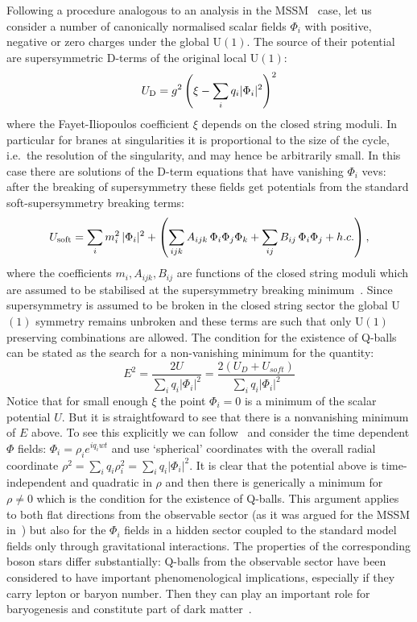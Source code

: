 \documentclass[11pt,a4paper]{article}
\newcommand{\be}{\begin{equation}}
\newcommand{\ee}{\end{equation}}
\begin{document}
Following a procedure analogous to an analysis in the MSSM~\cite{Kusenko:1997ad} case, let us consider a number of canonically normalised scalar fields $\Phi_i$ with positive, negative or zero charges under the global U$(1)$. The source of their potential are supersymmetric D-terms of the original local U$(1)$:
\be
U_{\rm D}=g^2 \left(\xi-\sum_{i} q_i| \Phi_i|^2\right)^2
\ee
where the Fayet-Iliopoulos coefficient $\xi$ depends on the closed string moduli. In particular for branes at singularities it is proportional to the size of the cycle, i.e.~the resolution of the singularity, and may hence be arbitrarily small. In this case there are solutions of the D-term equations that have vanishing $\Phi_i$ vevs: after the breaking of supersymmetry these fields get potentials from the standard soft-supersymmetry breaking terms:
\be
U_{\rm soft}= \sum_{i}m_i^2\, |\Phi_i|^2 + \left(\sum_{ijk} A_{ijk}\, \Phi_i\Phi_j\Phi_k +\sum_{ij}  B_{ij}\, \Phi_i\Phi_j + h.c.\right),
\ee
where the coefficients $m_i, A_{ijk}, B_{ij}$ are functions of the closed string moduli which are assumed to be stabilised at the supersymmetry breaking minimum~\cite{Choi:2005ge, hep-th/0505076, Aparicio:2014wxa, Aparicio:2015psl}. Since supersymmetry is assumed to be broken in the closed string sector the global U$(1)$ symmetry remains unbroken and these terms are such that only U$(1)$ preserving combinations are allowed. The condition for the existence of Q-balls can be stated as the search for a non-vanishing minimum for the quantity:
\be
E^2=\frac{2U}{\sum_{i} q_i|\Phi_i|^2}=\frac{2(U_D+U_{soft})}{\sum_{i} q_i|\Phi_i|^2}
\ee
Notice that for small enough $\xi$ the point $\Phi_i=0$ is a minimum of the scalar potential $U$. But it is straightfoward to see that there is a nonvanishing minimum of $E$ above. To see this explicitly we can follow~\cite{Kusenko:1997ad} and consider the time dependent  $\Phi$ fields: $\Phi_i=\rho_i e^{iq_iwt}$ and use  `spherical' coordinates  with the overall radial coordinate $\rho^2=\sum_{i} q_i\rho_i^2=\sum_{i} q_i|\Phi_i|^2$. It is clear that the potential above is time-independent and quadratic in $\rho$ and then there is generically a minimum for $\rho\neq 0$ which is the condition for the existence of Q-balls. This argument applies to both flat directions from the observable sector (as it was argued for the MSSM in~\cite{Kusenko:1997ad}) but also for the $\Phi_i$ fields in a hidden sector coupled to the standard model fields only through gravitational interactions. The properties of the corresponding boson stars differ substantially: Q-balls from the observable sector have been considered to have important phenomenological implications, especially if they carry lepton or baryon number. Then they can play an important role for baryogenesis and constitute part of dark matter~\cite{Kusenko:1997si, Enqvist:2003gh}. 
\end{document}
